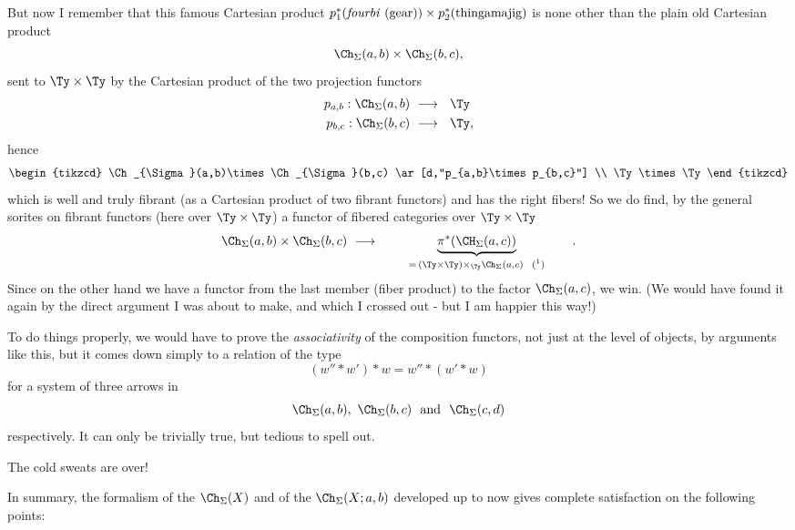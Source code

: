 But now I remember that this famous Cartesian product $p_1^*(\text{\textit{fourbi} (gear)})\times p_2^*(\text{thingamajig})$ is none other than the plain old Cartesian product
\[
\Ch_{\Sigma}(a,b)\times\Ch_{\Sigma}(b,c),
\]
sent to $\Ty\times\Ty$ by the Cartesian product of the two projection functors
\[
\begin{aligned}
p_{a,b} : \Ch_{\Sigma}(a,b) &\ \longrightarrow\ \ \Ty\\
p_{b,c} : \Ch_{\Sigma}(b,c) &\ \longrightarrow\ \ \Ty,
\end{aligned}
\]
hence
\[
\begin{tikzcd}
\Ch_{\Sigma}(a,b)\times\Ch_{\Sigma}(b,c) \ar[d,"p_{a,b}\times p_{b,c}"] \\
\Ty\times\Ty
\end{tikzcd}
\]
which is well and truly fibrant (as a Cartesian product of two fibrant functors) and has the right fibers! So we do find, by the general sorites on fibrant functors (here over $\Ty\times\Ty$) a functor of fibered categories over $\Ty\times\Ty$
\[
\Ch_{\Sigma}(a,b)\times\Ch_{\Sigma}(b,c) \ \longrightarrow\ \qquad \underbrace{\pi^*(\CH_{\Sigma}(a,c))}_{=\,(\Ty\times\Ty)\times_{\Ty}\Ch_{\Sigma}(a,c)\ \ \text{(\footnotemark)}} \qquad .
\]
Since on the other hand we have a functor from the last member (fiber product) to the factor $\Ch_{\Sigma}(a,c)$, we win. (We would have found it again by the direct argument I was about to make, and which I crossed out - but I am happier this way!)

To do things properly, we would have to prove the \textit{associativity} of the composition functors, not just at the level of objects, by arguments like this, but it comes down simply to a relation of the type
\[
(w''*w')*w = w''*(w'*w)
\]
for a system of three arrows in
\[
\Ch_{\Sigma}(a,b),\ \Ch_{\Sigma}(b,c)\ \ \text{and}\ \ \Ch_{\Sigma}(c,d)
\]
respectively. It can only be trivially
true, but tedious to spell out.

The cold sweats are over!

In summary, the formalism of the $\Ch_{\Sigma}(X)$ and of the $\Ch_{\Sigma}(X;a,b)$ developed up to now gives complete satisfaction on the following points:

